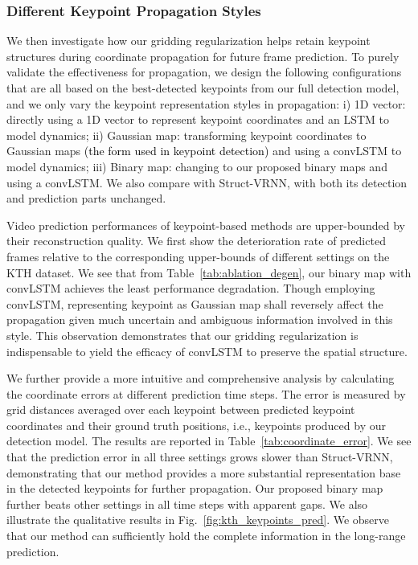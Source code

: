 \documentclass[letterpaper, 10 pt, conference]{ieeeconf}
\newcommand{\gao}[1]{{\textcolor{black}{#1}}}
\begin{document}
\subsubsection{Different Keypoint Propagation Styles}
\label{sec:ablation_pred}
We then investigate how our gridding regularization helps retain keypoint structures during coordinate propagation for future frame prediction. 
To purely validate the effectiveness for propagation, we design the following configurations that are all based on the best-detected keypoints from our full detection model, and we only vary the keypoint representation styles in propagation:
i) 1D vector: directly using a 1D vector to represent keypoint coordinates and an LSTM to model dynamics;
ii) Gaussian map: transforming keypoint coordinates to Gaussian maps \gao{(the form used in keypoint detection)} and using a convLSTM to model dynamics; 
iii) Binary map: changing to our proposed binary maps and using a convLSTM. 
We also compare with Struct-VRNN, with both its detection and prediction parts unchanged. 

Video prediction performances of keypoint-based methods are upper-bounded by their reconstruction quality.
We first show the deterioration rate of predicted frames relative to the corresponding upper-bounds of different settings on the KTH dataset.
We see that from Table~\ref{tab:ablation_degen}, our binary map with convLSTM achieves the least performance degradation. Though employing convLSTM, representing keypoint as Gaussian map shall reversely affect the propagation given much uncertain and ambiguous information involved in this style.
This observation demonstrates that our gridding regularization is indispensable to yield the efficacy of convLSTM to preserve the spatial structure.

We further provide a more intuitive and comprehensive analysis by calculating the coordinate errors at different prediction time steps.
The error is measured by grid distances averaged over each keypoint between predicted keypoint coordinates and their ground truth positions, i.e., keypoints produced by our detection model. 
The results are reported in Table~\ref{tab:coordinate_error}.
We see that the prediction error in all three settings grows slower than Struct-VRNN, demonstrating that our method provides a more substantial representation base in the detected keypoints for further propagation.
Our proposed binary map further beats other settings in all time steps with apparent gaps.  
We also illustrate the qualitative results in Fig.~\ref{fig:kth_keypoints_pred}.
We observe that our method can sufficiently hold the complete information in the long-range prediction.
\end{document}
